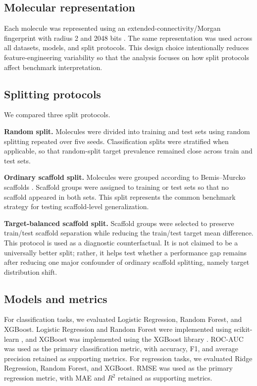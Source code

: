 \subsection{Molecular representation}

Each molecule was represented using an extended-connectivity/Morgan fingerprint with radius 2 and 2048 bits \citep{rogers2010extended}. The same representation was used across all datasets, models, and split protocols. This design choice intentionally reduces feature-engineering variability so that the analysis focuses on how split protocols affect benchmark interpretation.

\subsection{Splitting protocols}

We compared three split protocols.

\textbf{Random split.} Molecules were divided into training and test sets using random splitting repeated over five seeds. Classification splits were stratified when applicable, so that random-split target prevalence remained close across train and test sets.

\textbf{Ordinary scaffold split.} Molecules were grouped according to Bemis--Murcko scaffolds \citep{bemis1996properties}. Scaffold groups were assigned to training or test sets so that no scaffold appeared in both sets. This split represents the common benchmark strategy for testing scaffold-level generalization.

\textbf{Target-balanced scaffold split.} Scaffold groups were selected to preserve train/test scaffold separation while reducing the train/test target mean difference. This protocol is used as a diagnostic counterfactual. It is not claimed to be a universally better split; rather, it helps test whether a performance gap remains after reducing one major confounder of ordinary scaffold splitting, namely target distribution shift.

\subsection{Models and metrics}

For classification tasks, we evaluated Logistic Regression, Random Forest, and XGBoost. Logistic Regression and Random Forest were implemented using scikit-learn \citep{pedregosa2011scikit}, and XGBoost was implemented using the XGBoost library \citep{chen2016xgboost}. ROC-AUC was used as the primary classification metric, with accuracy, F1, and average precision retained as supporting metrics. For regression tasks, we evaluated Ridge Regression, Random Forest, and XGBoost. RMSE was used as the primary regression metric, with MAE and $R^2$ retained as supporting metrics.

